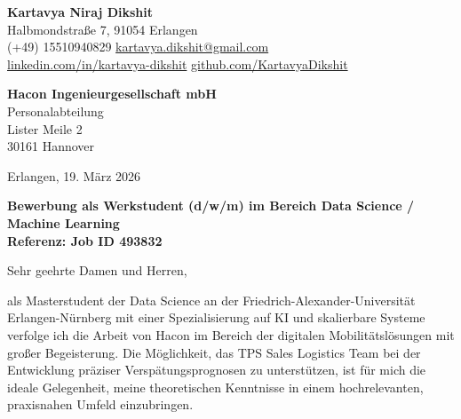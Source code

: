 \documentclass[10pt, a4paper]{article}
\begin{document}
\begin{flushleft}
    \textbf{\Large \color{primarycolor} Kartavya Niraj Dikshit} \\
    \vspace{2pt}
    \small
    Halbmondstraße 7, 91054 Erlangen \\
    \faPhone* (+49) 15510940829 \quad \faEnvelope* \href{mailto:kartavya.dikshit@gmail.com}{kartavya.dikshit@gmail.com} \\
    \faLinkedin \href{http://www.linkedin.com/in/kartavya-dikshit}{linkedin.com/in/kartavya-dikshit} \quad \faGithub \href{https://github.com/KartavyaDikshit}{github.com/KartavyaDikshit}
\end{flushleft}

\vspace{20pt}

\begin{flushleft}
    \textbf{Hacon Ingenieurgesellschaft mbH} \\
    Personalabteilung \\
    Lister Meile 2 \\
    30161 Hannover \\
\end{flushleft}

\begin{flushright}
    Erlangen, 19. März 2026
\end{flushright}

\vspace{30pt}

\noindent \textbf{\large Bewerbung als Werkstudent (d/w/m) im Bereich Data Science / Machine Learning} \\
\textbf{Referenz: Job ID 493832}

\vspace{25pt}

Sehr geehrte Damen und Herren,

\vspace{10pt}

als Masterstudent der Data Science an der Friedrich-Alexander-Universität Erlangen-Nürnberg mit einer Spezialisierung auf KI und skalierbare Systeme verfolge ich die Arbeit von Hacon im Bereich der digitalen Mobilitätslösungen mit großer Begeisterung. Die Möglichkeit, das TPS Sales Logistics Team bei der Entwicklung präziser Verspätungsprognosen zu unterstützen, ist für mich die ideale Gelegenheit, meine theoretischen Kenntnisse in einem hochrelevanten, praxisnahen Umfeld einzubringen.
\end{document}
